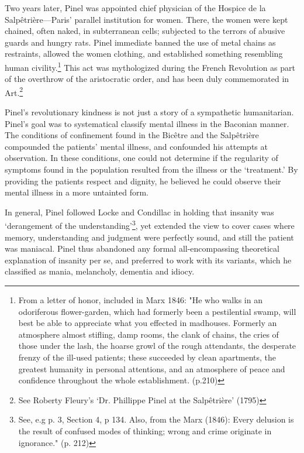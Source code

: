 Two years later, Pinel was appointed chief physician of the Hospice de la Salpêtrière---Paris' parallel institution for women. There, the women were kept chained, often naked, in subterranean cells; subjected to the terrors of abusive guards and hungry rats. Pinel immediate banned the use of metal chains as restraints, allowed the women clothing, and established something resembling human civility.\footnote{From a letter of honor, included in Marx 1846: "He who walks in an odoriferous flower-garden, which had formerly been a pestilential swamp, will best be able to appreciate what you effected in madhouses. Formerly an atmosphere almost stifling, damp rooms, the clank of chains, the cries of those under the lash, the hoarse growl of the rough attendants, the desperate frenzy of the ill-used patients; these succeeded by clean apartments, the greatest humanity in personal attentions, and an atmosphere of peace and confidence throughout the whole establishment. (p.210)} This act was mythologized during the French Revolution as part of the overthrow of the aristocratic order, and has been duly commemorated in Art.\footnote{See Roberty Fleury's `Dr. Phillippe Pinel at the Salpêtrière' (1795)}

Pinel's revolutionary kindness is not just a story of a sympathetic humanitarian. Pinel's goal was to systematical classify mental illness in the Baconian manner. The conditions of confinement found in the Bicêtre and the Salpêtrière compounded the patients' mental illness, and confounded his attempts at observation. In these conditions, one could not determine if the regularity of symptoms found in the population resulted from the illness or the `treatment.' By providing the patients respect and dignity, he believed he could observe their mental illness in a more untainted form.

In general, Pinel followed Locke and Condillac in holding that insanity was `derangement of the understanding'\footnote{See, e.g p. 3, Section 4, p 134. Also, from the Marx (1846): Every delusion is the result of confused modes of thinking; wrong and crime originate in ignorance." (p. 212)}, yet extended the view to cover cases where memory, understanding and judgment were perfectly sound, and still the patient was maniacal. Pinel thus abandoned any formal all-encompassing theoretical explanation of insanity per se, and preferred to work with its variants, which he classified as mania, melancholy, dementia and idiocy.

